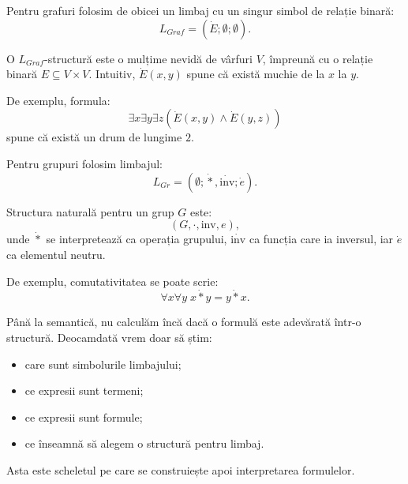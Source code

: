 \begin{eg}
	Pentru grafuri folosim de obicei un limbaj cu un singur simbol de relație binară:
	\[
		L_{Graf} = (\dot{E}; \emptyset; \emptyset).
	\]

	O \(L_{Graf}\)-structură este o mulțime nevidă de vârfuri \(V\), împreună cu o relație binară \(E \subseteq V \times V\).
	Intuitiv, \(\dot{E}(x,y)\) spune că există muchie de la \(x\) la \(y\).

	De exemplu, formula:
	\[
		\exists x \exists y \exists z(\dot{E}(x,y) \land \dot{E}(y,z))
	\]
	spune că există un drum de lungime \(2\).
\end{eg}

\begin{eg}
	Pentru grupuri folosim limbajul:
	\[
		L_{Gr} = (\emptyset; \dot{*}, \dot{\mathrm{inv}}; \dot{e}).
	\]

	Structura naturală pentru un grup \(G\) este:
	\[
		(G, \cdot, \mathrm{inv}, e),
	\]
	unde \(\dot{*}\) se interpretează ca operația grupului, \(\dot{\mathrm{inv}}\) ca funcția care ia inversul, iar \(\dot{e}\) ca elementul neutru.

	De exemplu, comutativitatea se poate scrie:
	\[
		\forall x \forall y \; x \dot{*} y = y \dot{*} x.
	\]
\end{eg}

\begin{note}
	Până la semantică, nu calculăm încă dacă o formulă este adevărată într-o structură. Deocamdată vrem doar să știm:

	\begin{itemize}
		\item care sunt simbolurile limbajului;
		\item ce expresii sunt termeni;
		\item ce expresii sunt formule;
		\item ce înseamnă să alegem o structură pentru limbaj.
	\end{itemize}

	Asta este scheletul pe care se construiește apoi interpretarea formulelor.
\end{note}
